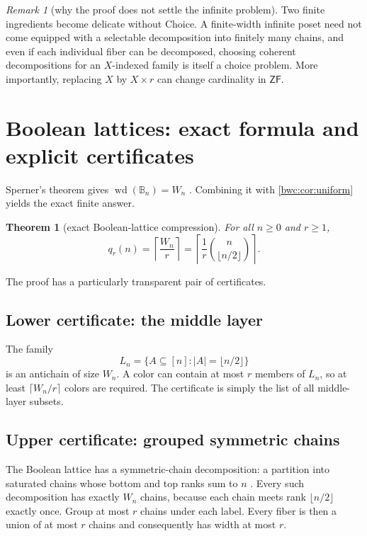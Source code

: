 \documentclass[11pt,letterpaper]{article}
\numberwithin{equation}{section}
\theoremstyle{plain}
\newtheorem{theorem}{Theorem}[section]
\theoremstyle{definition}
\theoremstyle{remark}
\newtheorem{remark}[remark]{Remark}
\newcommand{\B}{\mathbb B}
\newcommand{\pwidth}{\operatorname{wd}}
\newcommand{\ZF}{\mathsf{ZF}}
\begin{document}
\begin{remark}[why the proof does not settle the infinite problem]
Two finite ingredients become delicate without Choice.  A finite-width
infinite poset need not come equipped with a selectable decomposition into
finitely many chains, and even if each individual fiber can be decomposed,
choosing coherent decompositions for an $X$-indexed family is itself a choice
problem.  More importantly, replacing $X$ by $X\times r$ can change
cardinality in $\ZF$.
\end{remark}

\section{Boolean lattices: exact formula and explicit certificates}\label{bwc:sec:boolean}

Sperner's theorem gives $\pwidth(\B_n)=W_n$ \cite{Sperner1928}.  Combining it with
\cref{bwc:cor:uniform} yields the exact finite answer.

\begin{theorem}[exact Boolean-lattice compression]\label{bwc:thm:booleanexact}
For all $n\geq0$ and $r\geq1$,
\[
       q_r(n)=\left\lceil\frac{W_n}{r}\right\rceil
             =\left\lceil\frac1r\binom n{\lfloor n/2\rfloor}\right\rceil.
\]
\end{theorem}

The proof has a particularly transparent pair of certificates.

\subsection{Lower certificate: the middle layer}
The family
\[
       L_n=\{A\subseteq[n]:|A|=\lfloor n/2\rfloor\}
\]
is an antichain of size $W_n$.  A color can contain at most $r$ members of
$L_n$, so at least $\lceil W_n/r\rceil$ colors are required.  The certificate
is simply the list of all middle-layer subsets.

\subsection{Upper certificate: grouped symmetric chains}
The Boolean lattice has a symmetric-chain decomposition: a partition into
saturated chains whose bottom and top ranks sum to $n$ \cite{deBruijn1951,
GreeneKleitman1976}.  Every such decomposition has exactly $W_n$ chains,
because each chain meets rank $\lfloor n/2\rfloor$ exactly once.  Group at
most $r$ chains under each label.  Every fiber is then a union of at most
$r$ chains and consequently has width at most $r$.
\end{document}
